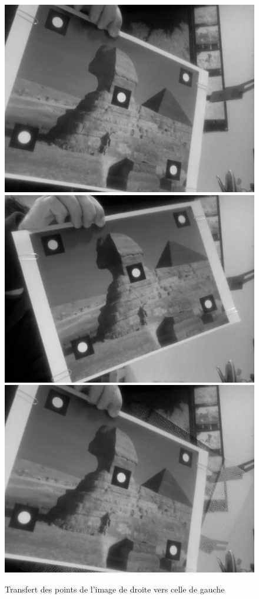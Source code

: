 \documentclass[12pt]{report}
\begin{document}
\begin{figure}
\begin{center}
\includegraphics[scale=0.3]{Images/I1.jpg}
\includegraphics[scale=0.3]{Images/I2.jpg}
\includegraphics[scale=0.3]{Images/transfer_result_tp3.jpg}
\caption{Transfert des points de l'image de droite vers celle de gauche}
\end{center}
\end{figure}
\end{document}
